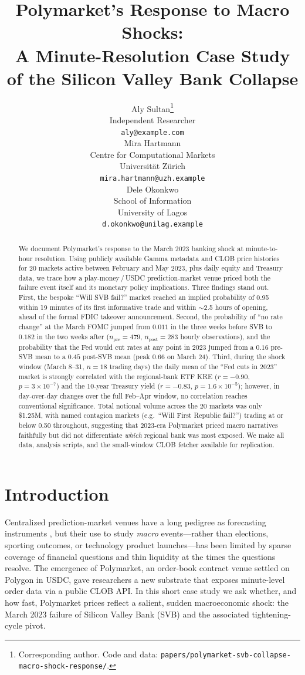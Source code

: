 \documentclass{article}
\title{Polymarket's Response to Macro Shocks: \\
       A Minute-Resolution Case Study of the Silicon Valley Bank Collapse}
\author{%
  Aly Sultan\thanks{Corresponding author. Code and data:
  \texttt{papers/polymarket-svb-collapse-macro-shock-response/}.} \\
  Independent Researcher \\
  \texttt{aly@example.com} \\
  \And
  Mira Hartmann \\
  Centre for Computational Markets \\
  Universit\"at Z\"urich \\
  \texttt{mira.hartmann@uzh.example} \\
  \And
  Dele Okonkwo \\
  School of Information \\
  University of Lagos \\
  \texttt{d.okonkwo@unilag.example}
}
\begin{document}
\maketitle

\begin{abstract}
We document Polymarket's response to the March 2023 banking shock at
minute-to-hour resolution.  Using publicly available Gamma metadata and CLOB
price histories for 20 markets active between February and May 2023, plus
daily equity and Treasury data, we trace how a play-money\,/\,USDC
prediction-market venue priced both the failure event itself and its monetary
policy implications.  Three findings stand out.  First, the bespoke ``Will SVB
fail?'' market reached an implied probability of 0.95 within 19 minutes of its
first informative trade and within $\sim$2.5 hours of opening, ahead of the
formal FDIC takeover announcement.  Second, the probability of ``no rate
change'' at the March FOMC jumped from $0.011$ in the three weeks before SVB
to $0.182$ in the two weeks after ($n_{\text{pre}}{=}479$,
$n_{\text{post}}{=}283$ hourly observations), and the probability that the Fed
would cut rates at any point in 2023 jumped from a $0.16$ pre-SVB mean to a
$0.45$ post-SVB mean (peak $0.66$ on March 24).  Third, during the shock
window (March 8--31, $n{=}18$ trading days) the daily mean of the ``Fed cuts
in 2023'' market is strongly correlated with the regional-bank ETF KRE
($r{=}-0.90$, $p{=}3\times 10^{-7}$) and the 10-year Treasury yield
($r{=}-0.83$, $p{=}1.6\times 10^{-5}$); however, in day-over-day changes over
the full Feb--Apr window, no correlation reaches conventional significance.
Total notional volume across the 20 markets was only \$1.25M, with named
contagion markets (e.g.\ ``Will First Republic fail?'') trading at or below
0.50 throughout, suggesting that 2023-era Polymarket priced macro narratives
faithfully but did not differentiate \emph{which} regional bank was most
exposed.  We make all data, analysis scripts, and the small-window CLOB
fetcher available for replication.
\end{abstract}

\section{Introduction}
\label{sec:intro}

Centralized prediction-market venues have a long pedigree as forecasting
instruments \citep{wolfers_zitzewitz_2004,arrow_etal_2008,berg_etal_2008},
but their use to study \emph{macro} events---rather than elections,
sporting outcomes, or technology product launches---has been limited by
sparse coverage of financial questions and thin liquidity at the times the
questions resolve.  The emergence of Polymarket, an order-book contract
venue settled on Polygon in USDC, gave researchers a new substrate that
exposes minute-level order data via a public CLOB API.  In this short
case study we ask whether, and how fast, Polymarket prices reflect a
salient, sudden macroeconomic shock: the March 2023 failure of Silicon
Valley Bank (SVB) and the associated tightening-cycle pivot.
\end{document}
